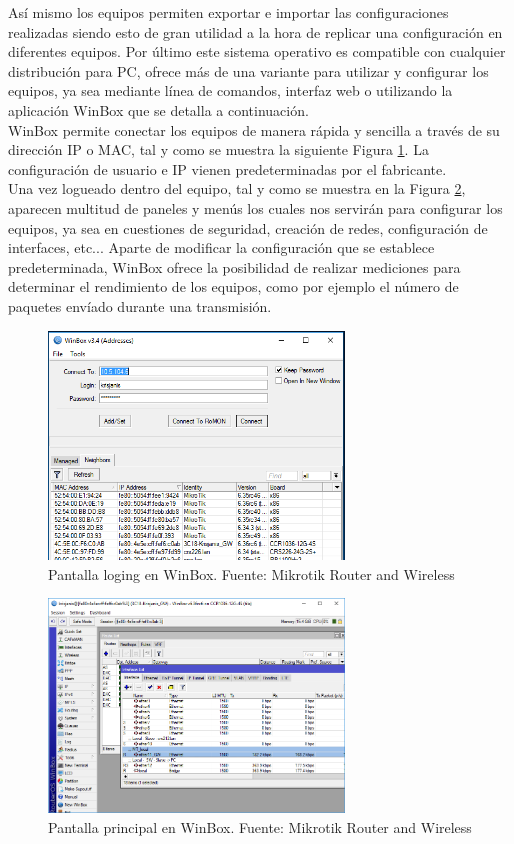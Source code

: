 	Así mismo los equipos permiten exportar e importar las configuraciones realizadas siendo esto de gran utilidad a la hora de replicar una configuración en diferentes equipos. Por último este sistema operativo es compatible con cualquier distribución para PC, ofrece más de una variante para utilizar y configurar los equipos, ya sea mediante línea de comandos, interfaz web o utilizando la aplicación WinBox que se detalla a continuación.\\
	
	WinBox permite conectar los equipos de manera rápida y sencilla a través de su dirección IP o MAC, tal y como se muestra la siguiente Figura \ref{inicioWinBox}. La configuración de usuario e IP vienen predeterminadas por el fabricante.\\
	
	Una vez logueado dentro del equipo, tal y como se muestra en la Figura \ref{mainWinBox}, aparecen multitud de paneles y menús los cuales nos servirán para configurar los equipos, ya sea en cuestiones de seguridad, creación de redes, configuración de interfaces, etc... Aparte de modificar la configuración que se establece predeterminada, WinBox ofrece la posibilidad de realizar mediciones para determinar el rendimiento de los equipos, como por ejemplo el número de paquetes envíado durante una transmisión.
		\begin{figure}[H]
			\centering
			\includegraphics[width=0.7\textwidth]{img/winbox_loader.png}
			\caption{Pantalla loging en WinBox. Fuente: Mikrotik Router and Wireless}
			\label{inicioWinBox}
		\end{figure}
		\begin{figure}[H]
			\centering
			\includegraphics[width=0.7\textwidth]{img/winbox.png}
			\caption{Pantalla principal en WinBox. Fuente: Mikrotik Router and Wireless}
			\label{mainWinBox}
		\end{figure}
